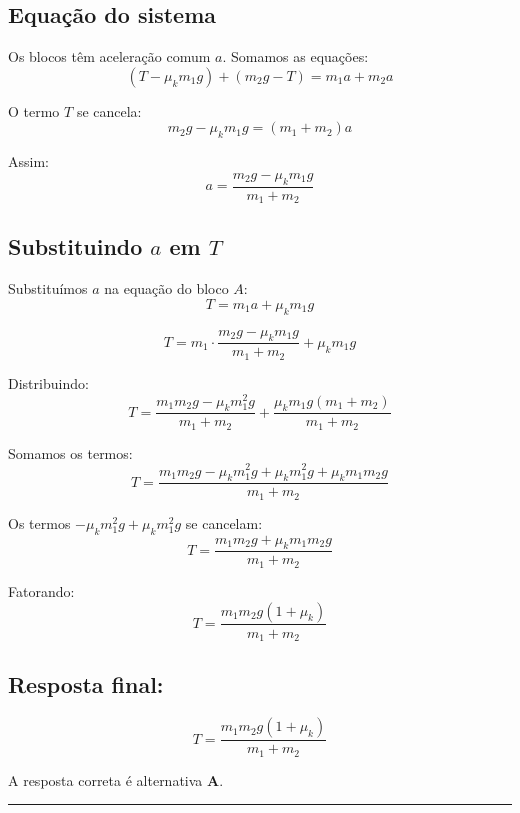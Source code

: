 \begin{flushleft}
\subsection*{Equação do sistema}

Os blocos têm aceleração comum \( a \). Somamos as equações:
\[
(T - \mu_k m_1 g) + (m_2 g - T) = m_1 a + m_2 a
\]

O termo \( T \) se cancela:
\[
m_2 g - \mu_k m_1 g = (m_1 + m_2) a
\]

Assim:
\[
\boxed{
a = \frac{m_2 g - \mu_k m_1 g}{m_1 + m_2}
}
\]

\subsection*{Substituindo \( a \) em \( T \)}

Substituímos \( a \) na equação do bloco \( A \):
\[
T = m_1 a + \mu_k m_1 g
\]

\[
T = m_1 \cdot \frac{m_2 g - \mu_k m_1 g}{m_1 + m_2} + \mu_k m_1 g
\]

Distribuindo:
\[
T = \frac{m_1 m_2 g - \mu_k m_1^2 g}{m_1 + m_2} + \frac{\mu_k m_1 g (m_1 + m_2)}{m_1 + m_2}
\]

Somamos os termos:
\[
T = \frac{m_1 m_2 g - \mu_k m_1^2 g + \mu_k m_1^2 g + \mu_k m_1 m_2 g}{m_1 + m_2}
\]

Os termos \( -\mu_k m_1^2 g + \mu_k m_1^2 g \) se cancelam:
\[
T = \frac{m_1 m_2 g + \mu_k m_1 m_2 g}{m_1 + m_2}
\]

Fatorando:
\[
T = \frac{m_1 m_2 g (1 + \mu_k)}{m_1 + m_2}
\]

\subsection*{Resposta final:}
\[
\boxed{
T = \frac{m_1 m_2 g (1 + \mu_k)}{m_1 + m_2}
}
\]

A resposta correta é alternativa \colorbox{green!50}{\textbf{A}}.


\end{flushleft}

\noindent\rule{\linewidth}{0.6pt}\\



